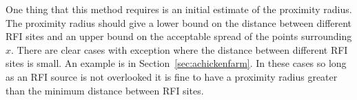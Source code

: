 \documentclass[a4paper,12pt]{article}
\begin{document}
                                                                                                                                                                                                                                                                                                                                                                                                                                                                                                                                                                                                                                                                                                                                                                                                                                                                                                                                                                                                                                                                                                                                                                                                                                                                                                                                                                                                                                                                                                                                                                                                                                                                                                                                                                                                                                                                                                                                                                                                                                                        One thing that this method requires is an initial estimate of the proximity radius. The proximity radius should give a lower bound on the distance between different RFI sites and an upper bound on the acceptable spread of the points surrounding $x$. There are clear cases with exception where the distance between different RFI sites is small. An example is in Section~\ref{sec:achickenfarm}. In these cases so long as an RFI source is not overlooked it is fine to have a proximity radius greater than the minimum distance between RFI sites.
\end{document}
